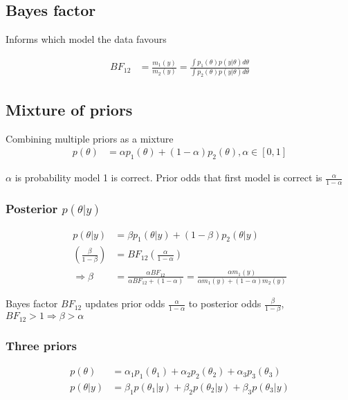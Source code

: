     \subsection{Bayes factor}
    Informs which model the data favours

    \begin{align*}
        BF_{12} &= \frac{m_1(y)}{m_2(y)} = 
        \frac{\int p_1(\theta)p(y|\theta)d\theta}
        {\int p_2(\theta)p(y|\theta)d\theta}
    \end{align*}

    \subsection{Mixture of priors}

    Combining multiple priors as a mixture
    \begin{align*}
        p(\theta) &= \alpha p_1(\theta) +
        (1-\alpha)p_2(\theta), \alpha \in [0, 1]
    \end{align*}

    $\alpha$ is probability model 1 is correct. Prior odds
    that first model is correct is $\frac{\alpha}{1-\alpha}$

    \subsubsection{Posterior $p(\theta|y)$}
    \begin{align*}
        p(\theta|y) &= \beta p_1(\theta|y) +
        (1-\beta)p_2(\theta|y)\\
        \left(\frac{\beta}{1-\beta}\right) &=
        BF_{12} \left(\frac{\alpha}{1-\alpha}\right)\\
        \Rightarrow \beta &= \frac{\alpha BF_{12}}
        {\alpha BF_{12} + (1 - \alpha)}
                          = \frac{\alpha m_1(y)}
                          {\alpha m_1(y) + (1-\alpha) m_2(y)}
    \end{align*}

    Bayes factor $BF_{12}$ updates prior odds
    $\frac{\alpha}{1-\alpha}$ to posterior odds
    $\frac{\beta}{1-\beta}$,
    $BF_{12} > 1 \Rightarrow \beta > \alpha$

    \subsubsection{Three priors}

    \begin{align*}
        p(\theta) &= \alpha_1 p_1(\theta_1) + \alpha_2
        p_2(\theta_2) + \alpha_3 p_3(\theta_3)\\
        p(\theta|y) &= \beta_1 p(\theta_1|y) + \beta_2
        p(\theta_2|y) + \beta_3 p(\theta_3|y)
    \end{align*}

